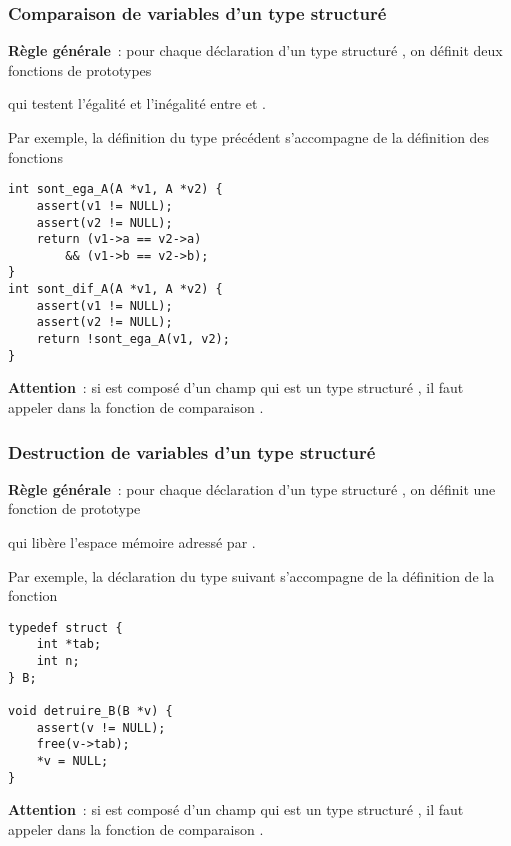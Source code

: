 \begin{frame}[fragile]
\frametitle{Comparaison de variables d'un type structuré}
{\bf Règle générale}~: pour chaque déclaration d'un type structuré
, on définit deux fonctions de prototypes
\begin{center}
     \smallskip

\end{center}
qui \alert{testent l'égalité} et \alert{l'inégalité} entre 
et .
\medskip

Par exemple, la définition du type  précédent s'accompagne de la
définition des fonctions
\begin{multicols}{2}
\begin{lstlisting}
int sont_ega_A(A *v1, A *v2) {
    assert(v1 != NULL);
    assert(v2 != NULL);
    return (v1->a == v2->a)
        && (v1->b == v2->b);
}
int sont_dif_A(A *v1, A *v2) {
    assert(v1 != NULL);
    assert(v2 != NULL);
    return !sont_ega_A(v1, v2);
}
\end{lstlisting}
\end{multicols}
\medskip

{\bf Attention}~: si  est composé d'un champ qui est un type
structuré , il faut appeler dans  la
fonction de comparaison .
\end{frame}

\begin{frame}[fragile]
\frametitle{Destruction de variables d'un type structuré}
{\bf Règle générale}~: pour chaque déclaration d'un type structuré
, on définit une fonction de prototype
\begin{center}
\end{center}
qui \alert{libère l'espace mémoire} adressé par .
\medskip

Par exemple, la déclaration du type  suivant s'accompagne de la
définition de la fonction
\begin{multicols}{2}
\begin{lstlisting}
typedef struct {
    int *tab;
    int n;
} B;

void detruire_B(B *v) {
    assert(v != NULL);
    free(v->tab);
    *v = NULL;
}
\end{lstlisting}
\end{multicols}
\medskip

{\bf Attention}~: si  est composé d'un champ qui est un type
structuré , il faut appeler dans  la
fonction de comparaison .
\end{frame}

